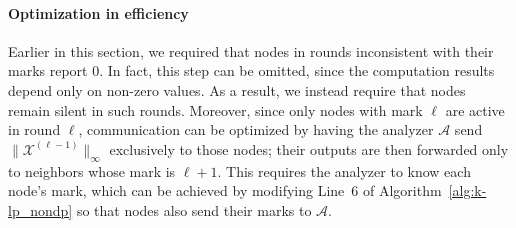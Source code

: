






\paragraph{Optimization in efficiency}

Earlier in this section, we required that nodes in rounds inconsistent with their marks report $0$. 
In fact, this step can be omitted, since the computation results depend only on non-zero values. 
As a result, we instead require that nodes remain silent in such rounds.
Moreover, since only nodes with mark $\ell$ are active in round $\ell$, communication can be optimized by having the analyzer $\mathcal{A}$ send $\|\mathcal{X}^{(\ell-1)}\|_\infty$ exclusively to those nodes; their outputs are then forwarded only to neighbors whose mark is $\ell+1$.
This requires the analyzer to know each node’s mark, which can be achieved by modifying Line~6 of Algorithm~\ref{alg:k-lp_nondp} so that nodes also send their marks to $\mathcal{A}$. 



